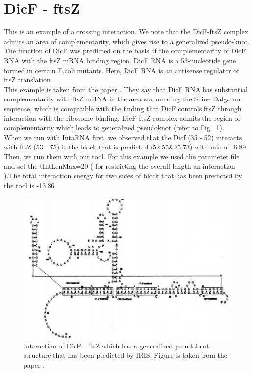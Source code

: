 \documentclass[twoside,a4paper]{report}
\numberwithin{equation}{section}
\begin{document}
	\section{DicF - ftsZ }
	
	This is an example of a crossing interaction. We note that the DicF-ftsZ complex admits an area of complementarity, which gives rise to a generalized pseudo-knot. \\   
	
	The function of DicF was predicted on the basis of the complementarity of DicF RNA with the ftsZ mRNA binding region. DicF RNA is a 53-nucleotide gene formed in certain E.coli mutants. Here, DicF RNA is an antisense regulator of ftsZ translation.\\
	
	This example is taken from the paper \citep{pervouchine2004iris}. They say that DicF RNA has substantial complementarity with ftsZ mRNA in the area surrounding the Shine Dalgarno sequence, which is compatible with the finding that DicF controls ftsZ through interaction with the ribosome binding. DicF-ftsZ complex admits the region of complementarity which leads to generalized pseudoknot (refer to Fig ~\ref{fig:dicf}). \\
	
	When we run with IntaRNA first, we observed that the Dicf (35 - 52) interacts with ftsZ (53 - 75) is the block that is predicted (52:55\&35:73) with mfe of -6.89. Then, we run them with our tool. For this example we used the parameter file and set the tIntLenMax=20 ( for restricting the overall length an interaction ).The total interaction energy for two sides of block that has been predicted by the tool is -13.86 \\
	
		\begin{figure}[h!tb]
		\includegraphics[width=1.0\linewidth]{dicf}
		\centering
		\caption{ Interaction of DicF - ftsZ which has a generalized pseudoknot structure that has been predicted by IRIS.  Figure is taken from the paper \citep{pervouchine2004iris}. } 
		\label{fig:dicf}
	\end{figure}
\end{document}
